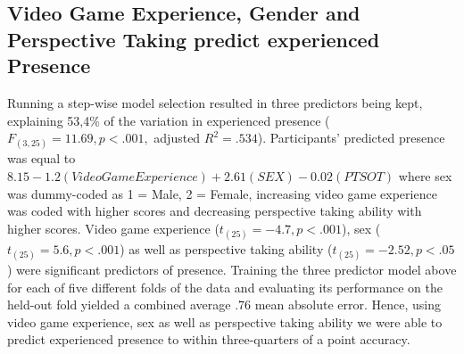 \subsection{Video Game Experience, Gender and Perspective Taking predict experienced Presence} Running a step-wise model selection resulted in three predictors being kept, explaining 53,4\% of the variation in experienced presence ($F_{(3,25)}=11.69, p < .001,$ adjusted $R^2=.534$). Participants' predicted presence was equal to $8.15 - 1.2 (Video Game Experience) + 2.61 (SEX) - 0.02 (PTSOT)$ where sex was dummy-coded as 1 = Male, 2 = Female, increasing video game experience was coded with higher scores and decreasing perspective taking ability with higher scores. Video game experience ($t_{(25)}=-4.7, p<.001$), sex ($t_{(25)}=5.6, p<.001$) as well as perspective taking ability ($t_{(25)}=-2.52, p<.05$) were significant predictors of presence.
Training the three predictor model above for each of five different folds of the data and evaluating its performance on the held-out fold yielded a combined average .76 mean absolute error. Hence, using video game experience, sex as well as perspective taking ability we were able to predict experienced presence to within three-quarters of a point accuracy.